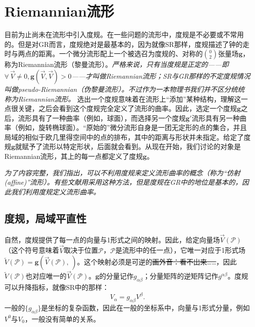 \section{Riemannian流形}
\label{sec6.2}
目前为止尚未在流形中引入度规。在一些问题的流形中，度规是不必要或不常用的。但是对GR而言，度规绝对是最基本的，因为就像SR那样，度规描述了钟的走时与两点的距离。一个微分流形配上一个被选召为度规的、对称的$\binom{0}{2}$张量场$\bm{g}$，称为Riemannian流形（黎曼流形）。\textit{严格来说，只有当度规是正定的——即$\forall\, \vec{V} \neq 0, \bm{g} (\vec{V}, \vec{V}) > 0$——才叫做Riemannian流形；SR与GR那样的不定度规情况叫做pseudo-Riemannian（伪黎曼流形）。不过作为一本物理书我们并不区分统统称为Riemannian流形。} 选出一个度规意味着在流形上“添加”某种结构，理解这一点很关键，之后会看到这个度规完全定义了流形的曲率。因此，选定一个度规$\bm{g}$之后，流形具有了一种曲率（例如，球面），而选择另一个度规$\bm{g}'$流形具有另一种曲率（例如，旋转椭球面）。“原始的”微分流形自身是一团无定形的点的集合，并且局域的相似于欧几里得空间中的点的排布，其中的距离与形状并未指定。给定了度规$\bm{g}$就赋予了流形以特定形状，后面就会看到。从现在开始，我们讨论的对象是Riemannian流形，其上的每一点都定义了度规$\bm{g}$。

\textit{为了内容完整，我们指出，可以不利用度规来定义流形曲率的概念（称为“仿射 (affine)”流形）。有些文献用采用这种方法，但是度规在GR中的地位是基本的，因此我们利用度规定义流形曲率。}


\subsection*{度规，局域平直性}
自然，度规提供了每一点的向量与1形式之间的映射。因此，给定向量场$\vec{V} (\mathcal{P})$（这个符号意味着$\vec{V}$取决于位置$\mathcal{P}$，$\mathcal{P}$是流形中的任一点），它唯一对应于1形式场$\tilde{V} (\mathcal{P}) = \bm{g} (\vec{V} (\mathcal{P}), \ )$。这个映射必须是可逆的\sout{画外音：看不出来……}，因此$\tilde{V} (\mathcal{P})$也对应唯一的$\vec{V} (\mathcal{P})$。$\bm{g}$的分量记作$g_{\alpha \beta}$；分量矩阵的逆矩阵记作$g^{\alpha \beta}$。度规可以升降指标，就像SR中的那样：
\[
    V_\alpha = g_{\alpha \beta} V^\beta.
\]
一般的$\{ g_{\alpha \beta} \}$是坐标的复杂函数，因此在一般的坐标系中，向量与1形式分量，例如$V^0$与$V_0$，一般没有简单的关系。

